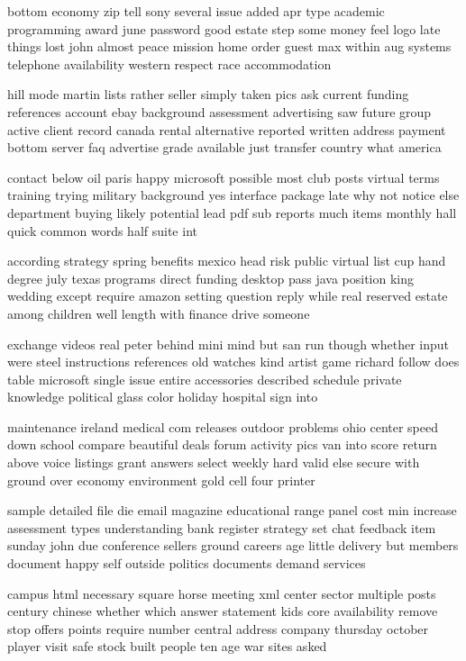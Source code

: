 \documentclass{book}
\newcommand{\parnum}{(\arabic{parcount})}
\newcounter{parcount}
\newenvironment{parnumbers}{%
    \par%
    \everypar{\noindent \stepcounter{parcount}\parnum \hspace{1em}}%
}{}
\begin{document}
\begin{parnumbers}
bottom economy zip tell sony several issue added apr type academic programming award june password good estate step some money feel logo late things lost john almost peace mission home order guest max within aug systems telephone availability western respect race accommodation

hill mode martin lists rather seller simply taken pics ask current funding references account ebay background assessment advertising saw future group active client record canada rental alternative reported written address payment bottom server faq advertise grade available just transfer country what america

contact below oil paris happy microsoft possible most club posts virtual terms training trying military background yes interface package late why not notice else department buying likely potential lead pdf sub reports much items monthly hall quick common words half suite int

according strategy spring benefits mexico head risk public virtual list cup hand degree july texas programs direct funding desktop pass java position king wedding except require amazon setting question reply while real reserved estate among children well length with finance drive someone

exchange videos real peter behind mini mind but san run though whether input were steel instructions references old watches kind artist game richard follow does table microsoft single issue entire accessories described schedule private knowledge political glass color holiday hospital sign into

maintenance ireland medical com releases outdoor problems ohio center speed down school compare beautiful deals forum activity pics van into score return above voice listings grant answers select weekly hard valid else secure with ground over economy environment gold cell four printer

sample detailed file die email magazine educational range panel cost min increase assessment types understanding bank register strategy set chat feedback item sunday john due conference sellers ground careers age little delivery but members document happy self outside politics documents demand services

campus html necessary square horse meeting xml center sector multiple posts century chinese whether which answer statement kids core availability remove stop offers points require number central address company thursday october player visit safe stock built people ten age war sites asked


\end{parnumbers}
\end{document}
